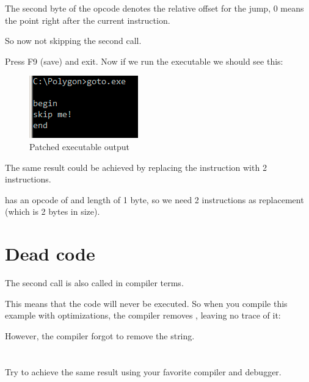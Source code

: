 The second byte of the \JMP opcode denotes the relative offset for the jump, 0 means the point
right after the current instruction.

So now \JMP not skipping the second \printf call.

Press F9 (save) and exit.  Now if we run the executable we should see this:

\begin{figure}[H]
\centering
\includegraphics[scale=\NormalScale]{patterns/065_GOTO/result.png}
\caption{Patched executable output}
\label{fig:goto_result}
\end{figure}

The same result could be achieved by replacing the \JMP instruction with 2 \NOP instructions.

\NOP has an opcode of  and length of 1 byte, so we need 2 instructions as \JMP replacement (which is 2 bytes in size).
\fi

\section{Dead code}

The second \printf call is also called  in compiler terms.

This means that the code will never be executed.
So when you compile this example with optimizations, the compiler removes , leaving
no trace of it:



However, the compiler forgot to remove the  string.


\ifdefined\IncludeExercises
\section{\Exercise}


Try to achieve the same result using your favorite compiler and debugger.
\fi

